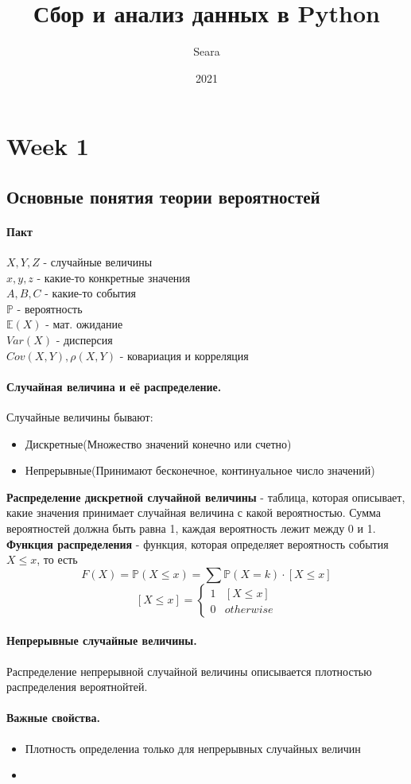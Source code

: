 \documentclass{article}
\title{Сбор и анализ данных в Python}
\date{2021}
\author{Seara}
\newcommand{\E}{\mathbb{E}}
\begin{document}
\maketitle
\newpage
{}

\section{Week 1}

\subsection{Основные понятия теории вероятностей}

\paragraph{Пакт} 
$X,Y,Z$ - случайные величины
\\
$x,y,z$ - какие-то конкретные значения
\\
$A,B,C$ - какие-то события
\\
$\mathbb{P}$ - вероятность
\\
$\E(X)$ - мат. ожидание
\\
$Var(X)$ - дисперсия
\\
$Cov(X,Y), \rho(X,Y)$ - ковариация и корреляция

\paragraph{Случайная величина и её распределение.}

Случайные величины бывают:
\begin{itemize}
	\item Дискретные(Множество значений конечно или счетно)
	\item Непрерывные(Принимают бесконечное, континуальное число значений)
\end{itemize}
{\bf Распределение дискретной случайной величины} - таблица, которая описывает, какие значения принимает случайная величина с какой вероятностью. Сумма вероятностей должна быть равна 1, каждая вероятность лежит между 0 и 1.
\\
{\bf Функция распределения} - функция, которая определяет вероятность события $X \leq x$, то есть
\[
F(X) = \mathbb{P}(X \leq x) = \sum \mathbb{P}(X=k)\cdot [X \leq x]
\]
\[
[X \leq x] = 
  \begin{cases}
     1 & [X \leq x] \\
     0 & otherwise
  \end{cases}
\]

\paragraph{Непрерывные случайные величины.} Распределение непрерывной случайной величины описывается плотностью распределения вероятнойтей.

\paragraph{Важные свойства.}
\begin{itemize}
	\item Плотность определениа только для непрерывных случайных величин
	\item
\end{itemize}
\end{document}
